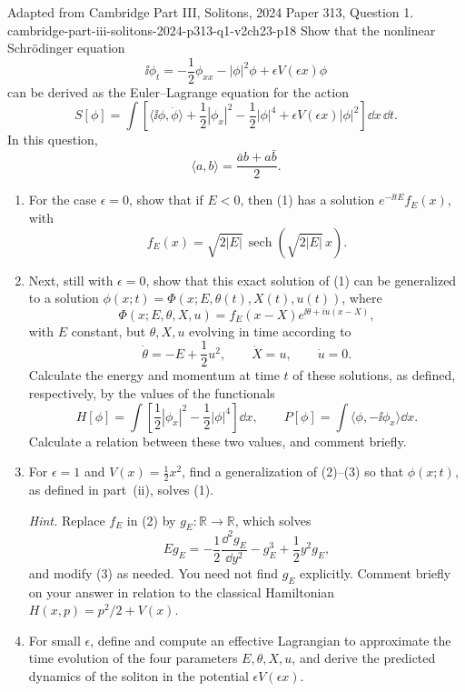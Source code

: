 \begin{enumerate}
  {Adapted from Cambridge Part III, Solitons, 2024 Paper 313,
  Question 1.}
  {cambridge-part-iii-solitons-2024-p313-q1-v2ch23-p18}
  Show that the nonlinear Schr\"odinger equation
  \begin{equation}
    \ii\phi_t=-\frac12\phi_{xx}-|\phi|^2\phi
      +\epsilon V(\epsilon x)\phi
    \tag{1}
  \end{equation}
  can be derived as the Euler--Lagrange equation for the action
  \[
    S[\phi]=\int\left[
      \langle \ii\phi,\dot\phi\rangle
      +\frac12|\phi_x|^2-\frac12|\phi|^4
      +\epsilon V(\epsilon x)|\phi|^2\right]\dd x\,\dd t.
  \]
  In this question,
  \[
    \langle a,b\rangle=\frac{\bar a b+a\bar b}{2}.
  \]
  \begin{enumerate}
    \item[(i)] For the case \(\epsilon=0\), show that if \(E<0\), then
      (1) has a solution \(e^{-\ii tE}f_E(x)\), with
      \[
        f_E(x)=\sqrt{2|E|}\,
          \operatorname{sech}\!\left(\sqrt{2|E|}\,x\right).
      \]
    \item[(ii)] Next, still with \(\epsilon=0\), show that this exact
      solution of (1) can be generalized to a solution
      \(\phi(x;t)=\Phi(x;E,\theta(t),X(t),u(t))\), where
      \begin{equation}
        \Phi(x;E,\theta,X,u)
          =f_E(x-X)e^{\ii\theta+iu(x-X)},
        \tag{2}
      \end{equation}
      with \(E\) constant, but \(\theta,X,u\) evolving in time according
      to
      \begin{equation}
        \dot\theta=-E+\frac12u^2,\qquad
        \dot X=u,\qquad \dot u=0.
        \tag{3}
      \end{equation}
      Calculate the energy and momentum at time \(t\) of these solutions,
      as defined, respectively, by the values of the functionals
      \[
        H[\phi]=\int\left[
          \frac12|\phi_x|^2-\frac12|\phi|^4\right]\dd x,
        \qquad
        P[\phi]=\int\langle\phi,-\ii\phi_x\rangle \dd x.
      \]
      Calculate a relation between these two values, and comment briefly.
    \item[(iii)] For \(\epsilon=1\) and \(V(x)=\tfrac12x^2\), find a
      generalization of (2)--(3) so that \(\phi(x;t)\), as defined in
      part~(ii), solves (1).

      \emph{Hint.}  Replace \(f_E\) in (2) by
      \(g_E:\mathbb R\to\mathbb R\), which solves
      \[
        Eg_E=-\frac12\frac{\dd^2g_E}{\dd y^2}-g_E^3
          +\frac12y^2g_E,
      \]
      and modify (3) as needed.  You need not find \(g_E\) explicitly.
      Comment briefly on your answer in relation to the classical
      Hamiltonian \(H(x,p)=p^2/2+V(x)\).
    \item[(iv)] For small \(\epsilon\), define and compute an effective
      Lagrangian to approximate the time evolution of the four parameters
      \(E,\theta,X,u\), and derive the predicted dynamics of the soliton
      in the potential \(\epsilon V(\epsilon x)\).
  \end{enumerate}


\end{enumerate}
